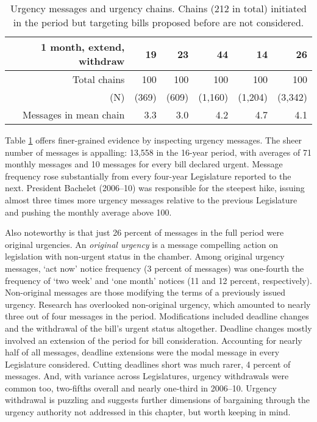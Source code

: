\documentclass[letter,12pt]{article}
\begin{document}
\begin{table}
\begin{tabular}{rrrrr|r}
1 month, extend, withdraw & 19 & 23 & 44 & 14 &  26  \\ \hline
Total chains              & 100 & 100 & 100 & 100 & 100  \\
(N)                       & (369) & (609) & (1,160) & (1,204) &(3,342) \\ 
Messages in mean chain    & 3.3   & 3.0   & 4.2     & 4.7     & 4.1 \\ \hline
\end{tabular}
\caption{Urgency messages and urgency chains. Chains (212 in total) initiated in the period but targeting bills proposed before are not considered.}\label{t:freqUrg}
\end{table}

Table \ref{t:freqUrg} offers finer-grained evidence by inspecting urgency messages. The sheer number of messages is appalling: 13,558 in the 16-year period, with averages of 71 monthly messages and 10 messages for every bill declared urgent. Message frequency rose substantially from every four-year Legislature reported to the next. President Bachelet (2006--10) was responsible for the steepest hike, issuing almost three times more urgency messages relative to the previous Legislature and pushing the monthly average above 100. 

Also noteworthy is that just 26 percent of messages in the full period were original urgencies. An \emph{original urgency} is a message compelling action on legislation with non-urgent status in the chamber. Among original urgency messages, `act now' notice frequency (3 percent of messages) was one-fourth the frequency of `two week' and `one month' notices (11 and 12 percent, respectively). Non-original messages are those modifying the terms of a previously issued urgency. Research has overlooked non-original urgency, which amounted to nearly three out of four messages in the period. Modifications included deadline changes and the withdrawal of the bill's urgent status altogether. Deadline changes mostly involved an extension of the period for bill consideration. Accounting for nearly half of all messages, deadline extensions were the modal message in every Legislature considered. Cutting deadlines short was much rarer, 4 percent of messages. And, with variance across Legislatures, urgency withdrawals were common too, two-fifths overall and nearly one-third in 2006--10. Urgency withdrawal is puzzling and suggests further dimensions of bargaining through the urgency authority not addressed in this chapter, but worth keeping in mind. 
\end{document}
